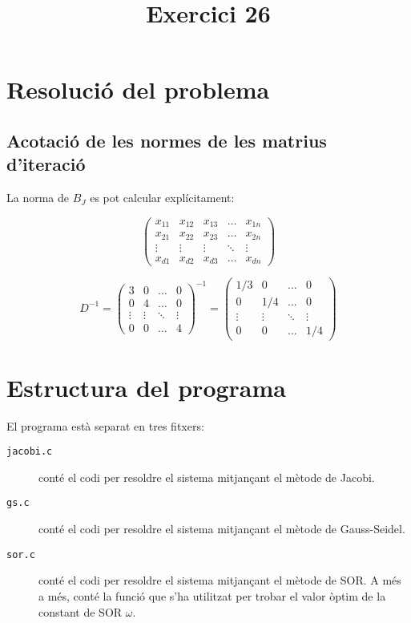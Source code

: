 \documentclass[12pt]{article}
\title{Exercici 26}
\begin{document}
\section{Resolució del problema}

\renewcommand{\thesubsection}{\alph{subsection}}

\subsection{Acotació de les normes de les matrius d'iteració}

La norma de $B_J$ es pot calcular explícitament:

\begin{equation*}
\left(\begin{matrix}
    x_{11} & x_{12} & x_{13} & \dots  & x_{1n} \\
    x_{21} & x_{22} & x_{23} & \dots  & x_{2n} \\
    \vdots & \vdots & \vdots & \ddots & \vdots \\
    x_{d1} & x_{d2} & x_{d3} & \dots  & x_{dn}
\end{matrix}\right)
\end{equation*}

\begin{equation*}
D^{-1}=
\left(\begin{matrix}
    3       & 0       & \dots   & 0       \\
    0       & 4       & \dots   & 0       \\
    \vdots  & \vdots  & \ddots  & \vdots  \\
    0       & 0       & \dots   & 4
\end{matrix}\right)^{-1}=
\left(\begin{matrix}
    1/3     & 0       & \dots   & 0       \\
    0       & 1/4     & \dots   & 0       \\
    \vdots  & \vdots  & \ddots  & \vdots  \\
    0       & 0       & \dots   & 1/4
\end{matrix}\right)
\end{equation*}

\section{Estructura del programa}
El programa està separat en tres fitxers:

\begin{description}
\item [\texttt{jacobi.c}] conté el codi per resoldre el sistema mitjançant el
  mètode de Jacobi.
\item [\texttt{gs.c}] conté el codi per resoldre el sistema mitjançant el
  mètode de Gauss-Seidel.
\item [\texttt{sor.c}] conté el codi per resoldre el sistema mitjançant el
  mètode de SOR. A més a més, conté la funció que s'ha utilitzat per trobar
  el valor òptim de la constant de SOR $\omega$.
\end{description}
\end{document}
